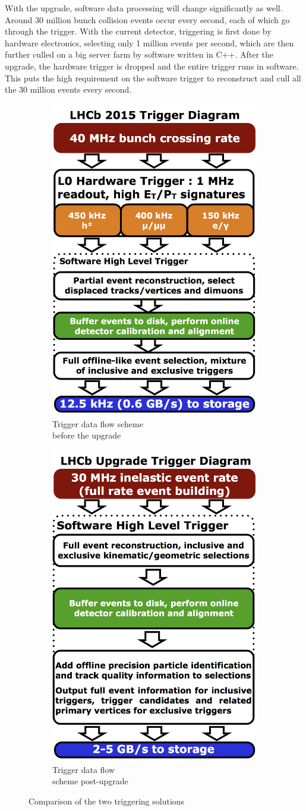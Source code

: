 \documentclass[12pt]{article}
\begin{document}
	With the upgrade, software data processing will change significantly as well. Around 30 million bunch collision events occur every second, each of which go through the trigger. With the current detector, triggering is first done by hardware electronics, selecting only 1 million events per second, which are then further culled on a big server farm by software written in C++. After the upgrade, the hardware trigger is dropped and the entire trigger runs in software. This puts the high requirement on the software trigger to reconstruct and cull all the 30 million events every second.
	
	\begin{figure}[H]
		\centering
		\begin{subfigure}{.5\textwidth}
			\centering
			\includegraphics[width=.4\linewidth]{LHCb_Trigger_RunII_May2015}
			\caption{Trigger data flow scheme\\ before the upgrade}
			\label{fig:sub1}
		\end{subfigure}%
		\begin{subfigure}{.5\textwidth}
			\centering
			\includegraphics[width=.4\linewidth]{LHCb_Trigger_RunIII_May2015}
			\caption{Trigger data flow\\ scheme post-upgrade}
			\label{fig:sub2}
		\end{subfigure}
		\caption{Comparison of the two triggering solutions}
		\label{fig_trigger_compare}
	\end{figure}
	
\end{document}
